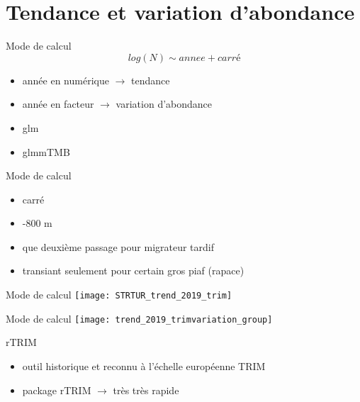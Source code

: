 \documentclass[]{beamer}
\begin{document}
\section{Tendance et variation d'abondance}



\begin{frame}{Mode de calcul}
  \begin{equation}
    \label{eq:2}
    log(N)\sim annee + carré
  \end{equation}
  \begin{itemize}
  \item année en numérique $\rightarrow$ tendance
  \item année en facteur $\rightarrow$ variation d'abondance
  \end{itemize}
  \begin{itemize}
  \item glm
  \item glmmTMB
  \end{itemize}
\end{frame}


\begin{frame}{Mode de calcul}
  \begin{itemize}
  \item carré
  \item -800 m
  \item que deuxième passage pour migrateur tardif
  \item transiant seulement pour certain gros piaf (rapace)
  \end{itemize}
\end{frame}




\begin{frame}{Mode de calcul}
   \texttt{[image: STRTUR\_trend\_2019\_trim]}
\end{frame}

\begin{frame}{Mode de calcul}
   \texttt{[image: trend\_2019\_trimvariation\_group]}
\end{frame}


\begin{frame}{rTRIM}
  \begin{itemize}
  \item outil historique et reconnu à l'échelle européenne TRIM
  \item package rTRIM $\rightarrow$ très très rapide
  \end{itemize}
\end{frame}
\end{document}

